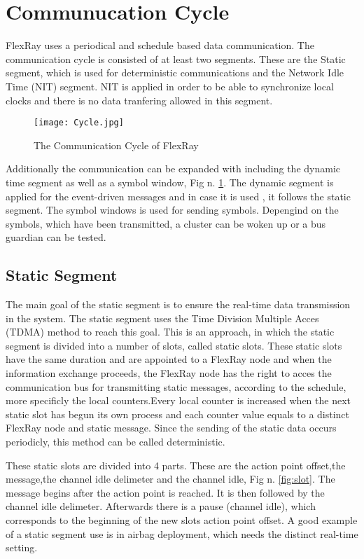 \documentclass[conference]{IEEEtran}
\begin{document}
\section{Communucation Cycle}
FlexRay uses a periodical and schedule based data communication. The communication cycle is consisted of at least two segments. These are the Static segment, which is used for deterministic communications and the Network Idle Time (NIT) segment. NIT is applied in order to be able to synchronize local clocks and there is no data tranfering allowed in this segment.

\begin{figure}[htbp]
\texttt{[image: Cycle.jpg]}
  \caption{The Communication Cycle of FlexRay}
  \label{fig:cycle}
\end{figure}

Additionally the communication can be expanded with including the dynamic time segment as well as a symbol window, Fig n. \ref{fig:cycle}. The dynamic segment is applied for the event-driven messages and in case it is used , it follows the static segment. The symbol windows is used for sending symbols. Depengind on the symbols, which have been transmitted, a cluster can be  woken up or a bus guardian can be tested.


\subsection{Static Segment}
The main goal of the static segment is to ensure the real-time data transmission in the system. The static segment uses the Time Division Multiple Acces (TDMA) method to reach this goal. This is an approach, in which the static segment is divided into a number of slots, called static slots. These static slots have the same duration and are appointed to a FlexRay node and when the information exchange proceeds, the FlexRay node has the right to acces the communication bus for transmitting static messages, according to the schedule, more specificly the local counters.Every local counter is increased when the next static slot has begun its own process and each counter value equals to a distinct FlexRay node and static message. Since the sending of the static data occurs periodicly, this method can be called deterministic.

These static slots are divided into 4 parts. These are the action point offset,the message,the channel idle delimeter and the channel idle, Fig n. \ref{fig:slot}. The message begins after the action point is reached. It is then followed by the channel idle delimeter. Afterwards there is a pause (channel idle), which corresponds to the beginning of the new slots action point offset. A good example of a static segment use is in airbag deployment, which needs the distinct real-time setting.
\end{document}
